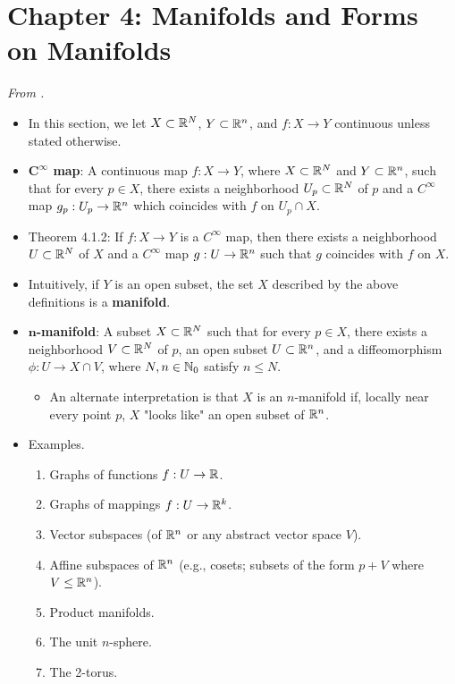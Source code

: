 \documentclass[../notes.tex]{subfiles}
\begin{document}
\section{Chapter 4: Manifolds and Forms on Manifolds}
\emph{From \textcite{bib:DifferentialForms}.}
\begin{itemize}
    \item {}In this section, we let $X\subset\mathbb{R}^N$, $Y\subset\mathbb{R}^n$, and $f:X\to Y$ continuous unless stated otherwise.
    \item \textbf{$\bm{C^\infty}$ map}: A continuous map $f:X\to Y$, where $X\subset\mathbb{R}^N$ and $Y\subset\mathbb{R}^n$, such that for every $p\in X$, there exists a neighborhood $U_p\subset\mathbb{R}^N$ of $p$ and a $C^\infty$ map $g_p:U_p\to\mathbb{R}^n$ which coincides with $f$ on $U_p\cap X$.
    \item Theorem 4.1.2: If $f:X\to Y$ is a $C^\infty$ map, then there exists a neighborhood $U\subset\mathbb{R}^N$ of $X$ and a $C^\infty$ map $g:U\to\mathbb{R}^n$ such that $g$ coincides with $f$ on $X$.
    \item Intuitively, if $Y$ is an open subset, the set $X$ described by the above definitions is a \textbf{manifold}.
    \item \textbf{$\bm{n}$-manifold}: A subset $X\subset\mathbb{R}^N$ such that for every $p\in X$, there exists a neighborhood $V\subset\mathbb{R}^N$ of $p$, an open subset $U\subset\mathbb{R}^n$, and a diffeomorphism $\phi:U\to X\cap V$, where $N,n\in\mathbb{N}_0$ satisfy $n\leq N$.
    \begin{itemize}
        \item An alternate interpretation is that $X$ is an $n$-manifold if, locally near every point $p$, $X$ "looks like" an open subset of $\mathbb{R}^n$.
    \end{itemize}
    \item Examples.
    \begin{enumerate}
        \item Graphs of functions $f:U\to\mathbb{R}$.
        \item Graphs of mappings $f:U\to\mathbb{R}^k$.
        \item Vector subspaces (of $\mathbb{R}^n$ or any abstract vector space $V$).
        \item Affine subspaces of $\mathbb{R}^n$ (e.g., cosets; subsets of the form $p+V$ where $V\leq\mathbb{R}^n$).
        \item Product manifolds.
        \item The unit $n$-sphere.
        \item The 2-torus.
    \end{enumerate}

\end{itemize}
\end{document}
